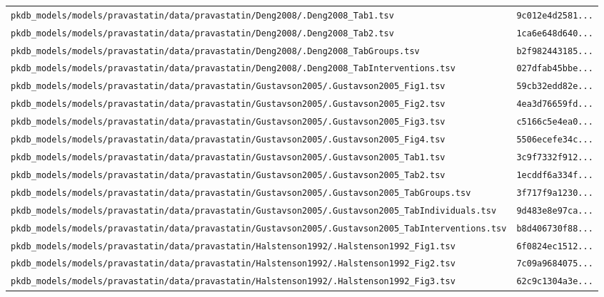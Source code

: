 \documentclass{article}
\begin{document}
\begin{longtable}{ll}
\texttt{pkdb\_models/models/pravastatin/data/pravastatin/Deng2008/.Deng2008\_Tab1.tsv} & \texttt{9c012e4d2581...} \\
\texttt{pkdb\_models/models/pravastatin/data/pravastatin/Deng2008/.Deng2008\_Tab2.tsv} & \texttt{1ca6e648d640...} \\
\texttt{pkdb\_models/models/pravastatin/data/pravastatin/Deng2008/.Deng2008\_TabGroups.tsv} & \texttt{b2f982443185...} \\
\texttt{pkdb\_models/models/pravastatin/data/pravastatin/Deng2008/.Deng2008\_TabInterventions.tsv} & \texttt{027dfab45bbe...} \\
\texttt{pkdb\_models/models/pravastatin/data/pravastatin/Gustavson2005/.Gustavson2005\_Fig1.tsv} & \texttt{59cb32edd82e...} \\
\texttt{pkdb\_models/models/pravastatin/data/pravastatin/Gustavson2005/.Gustavson2005\_Fig2.tsv} & \texttt{4ea3d76659fd...} \\
\texttt{pkdb\_models/models/pravastatin/data/pravastatin/Gustavson2005/.Gustavson2005\_Fig3.tsv} & \texttt{c5166c5e4ea0...} \\
\texttt{pkdb\_models/models/pravastatin/data/pravastatin/Gustavson2005/.Gustavson2005\_Fig4.tsv} & \texttt{5506ecefe34c...} \\
\texttt{pkdb\_models/models/pravastatin/data/pravastatin/Gustavson2005/.Gustavson2005\_Tab1.tsv} & \texttt{3c9f7332f912...} \\
\texttt{pkdb\_models/models/pravastatin/data/pravastatin/Gustavson2005/.Gustavson2005\_Tab2.tsv} & \texttt{1ecddf6a334f...} \\
\texttt{pkdb\_models/models/pravastatin/data/pravastatin/Gustavson2005/.Gustavson2005\_TabGroups.tsv} & \texttt{3f717f9a1230...} \\
\texttt{pkdb\_models/models/pravastatin/data/pravastatin/Gustavson2005/.Gustavson2005\_TabIndividuals.tsv} & \texttt{9d483e8e97ca...} \\
\texttt{pkdb\_models/models/pravastatin/data/pravastatin/Gustavson2005/.Gustavson2005\_TabInterventions.tsv} & \texttt{b8d406730f88...} \\
\texttt{pkdb\_models/models/pravastatin/data/pravastatin/Halstenson1992/.Halstenson1992\_Fig1.tsv} & \texttt{6f0824ec1512...} \\
\texttt{pkdb\_models/models/pravastatin/data/pravastatin/Halstenson1992/.Halstenson1992\_Fig2.tsv} & \texttt{7c09a9684075...} \\
\texttt{pkdb\_models/models/pravastatin/data/pravastatin/Halstenson1992/.Halstenson1992\_Fig3.tsv} & \texttt{62c9c1304a3e...} \\

\end{longtable}
\end{document}

